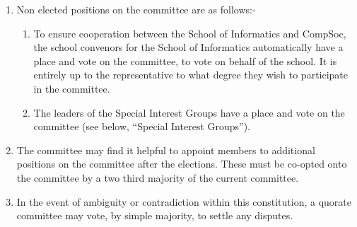 \begin {enumerate}
    It is important to note that the above are suggestions to what those elected
    to the positions should be responsible, not absolute rules. Delegation is
    encouraged and necessary, but those in the relevant positions should take
    responsibility for delegating the tasks and making sure they get done.

    \item Non elected positions on the committee are as follows:-
      \begin{enumerate}
        \item To ensure cooperation between the School of Informatics and CompSoc,
          the school convenors for the School of Informatics automatically
          have a place and vote on the committee, to vote on behalf of the school.
          It is entirely up to the representative to what degree they wish
          to participate in the committee.
        \item The leaders of the Special Interest Groups have a place and vote on
          the committee (see below, ``Special Interest Groups'').
      \end{enumerate}

    \item The committee may find it helpful to appoint members to additional positions
      on the committee after the elections. These must be co-opted onto the committee by a two
      third majority of the current committee.

    \item In the event of ambiguity or contradiction within this constitution, a quorate committee may vote, by simple majority, to settle any disputes.

\end{enumerate}
